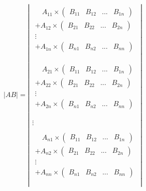 \begin{gather}
    \left | AB \right |
    =\left | \begin{matrix}
    \begin{matrix}
        \quad A_{11}\times\begin{pmatrix}
            B_{11} & B_{12} & ... & B_{1n}
        \end{pmatrix}\\
        +A_{12}\times\begin{pmatrix}
            B_{21} & B_{22} & ... & B_{2n}
        \end{pmatrix}\\
        \vdots\\
        +A_{1n}\times\begin{pmatrix}
            B_{n1} & B_{n2} & ... & B_{nn}
        \end{pmatrix}\\
    \end{matrix}\\
    \\
    \begin{matrix}
        \quad A_{21}\times\begin{pmatrix}
            B_{11} & B_{12} & ... & B_{1n}
        \end{pmatrix}\\
        +A_{22}\times\begin{pmatrix}
            B_{21} & B_{22} & ... & B_{2n}
        \end{pmatrix}\\
        \vdots\\
        +A_{2n}\times\begin{pmatrix}
            B_{n1} & B_{n2} & ... & B_{nn}
        \end{pmatrix}\\
    \end{matrix}\\
    \\
    \vdots\\
    \\
    \begin{matrix}
        \quad A_{n1}\times\begin{pmatrix}
            B_{11} & B_{12} & ... & B_{1n}
        \end{pmatrix}\\
        +A_{n2}\times\begin{pmatrix}
            B_{21} & B_{22} & ... & B_{2n}
        \end{pmatrix}\\
        \vdots\\
        +A_{nn}\times\begin{pmatrix}
            B_{n1} & B_{n2} & ... & B_{nn}
        \end{pmatrix}\\
    \end{matrix}\\
    \end{matrix} \right |
    \label{eq:ABdetExpansion}
\end{gather}

